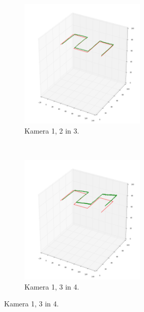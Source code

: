 \documentclass[a4paper, 12pt]{book}
\begin{document}
\begin{figure}
    \centering
    \begin{subfigure}[t]{0.5\textwidth}
        \centering
        \includegraphics[width=6cm]{123.png}
        \caption{Kamera 1, 2 in 3.}
    \end{subfigure}~
    \begin{subfigure}[t]{0.5\textwidth}
        \centering
        \includegraphics[width=6cm]{134.png}
        \caption{Kamera 1, 3 in 4.}
    \end{subfigure}
    

\end{figure}
\end{document}
